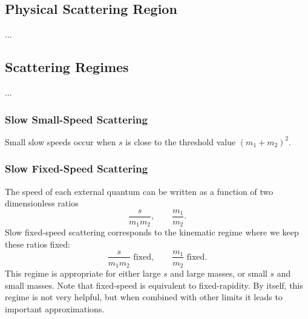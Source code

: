 \subsection{Physical Scattering Region}
...
\subsection{Scattering Regimes}
...
\subsubsection{Slow Small-Speed Scattering}
Small slow speeds occur when $s$ is close to the threshold value $(m_{1} + m_{2})^{2}$.
\subsubsection{Slow Fixed-Speed Scattering}
The speed of each external quantum can be written as a function of two dimensionless ratios
\begin{equation}
	\frac{s}{m_{1} m_{2}}, \qquad \frac{m_{1}}{m_{2}}.
\end{equation}
Slow fixed-speed scattering corresponds to the kinematic regime where we keep these ratios fixed:
\begin{equation}
	\frac{s}{m_{1} m_{2}} \text{ fixed}, \qquad \frac{m_{1}}{m_{2}} \text{ fixed}.
\end{equation}
This regime is appropriate for either large $s$ and large masses, or small $s$ and small masses. Note that fixed-speed is equivalent to fixed-rapidity. By itself, this regime is not very helpful, but when combined with other limits it leads to important approximations.
